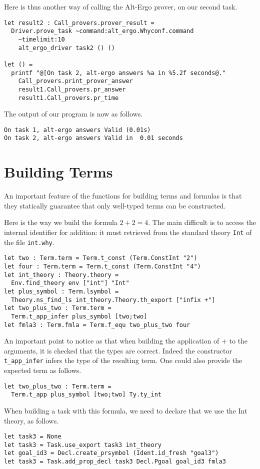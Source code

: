 Here is thus another way of calling the Alt-Ergo prover, on our second task.
\begin{verbatim}
let result2 : Call_provers.prover_result = 
  Driver.prove_task ~command:alt_ergo.Whyconf.command
    ~timelimit:10
    alt_ergo_driver task2 () ()

let () = 
  printf "@[On task 2, alt-ergo answers %a in %5.2f seconds@."
    Call_provers.print_prover_answer 
    result1.Call_provers.pr_answer
    result1.Call_provers.pr_time
\end{verbatim}
The output of our program is now as follows.
\begin{verbatim}
On task 1, alt-ergo answers Valid (0.01s)
On task 2, alt-ergo answers Valid in  0.01 seconds
\end{verbatim}

\section{Building Terms}

An important feature of the functions for building terms and formulas
is that they statically guarantee that only well-typed terms can be
constructed.

Here is the way we build the formula $2+2=4$. The main difficult is to
access the internal identifier for addition: it must retrieved from
the standard theory \texttt{Int} of the file \texttt{int.why}.
\begin{verbatim}
let two : Term.term = Term.t_const (Term.ConstInt "2")
let four : Term.term = Term.t_const (Term.ConstInt "4")
let int_theory : Theory.theory = 
  Env.find_theory env ["int"] "Int"
let plus_symbol : Term.lsymbol = 
  Theory.ns_find_ls int_theory.Theory.th_export ["infix +"]
let two_plus_two : Term.term = 
  Term.t_app_infer plus_symbol [two;two] 
let fmla3 : Term.fmla = Term.f_equ two_plus_two four
\end{verbatim}
An important point to notice as that when building the application of
$+$ to the arguments, it is checked that the types are correct. Indeed
the constructor \texttt{t\_app\_infer} infers the type of the resulting
term. One could also provide the expected term as follows.
\begin{verbatim}
let two_plus_two : Term.term = 
  Term.t_app plus_symbol [two;two] Ty.ty_int
\end{verbatim}

When building a task with this formula, we need to declare that we use the Int theory, as follows.
\begin{verbatim}
let task3 = None
let task3 = Task.use_export task3 int_theory
let goal_id3 = Decl.create_prsymbol (Ident.id_fresh "goal3") 
let task3 = Task.add_prop_decl task3 Decl.Pgoal goal_id3 fmla3
\end{verbatim}

